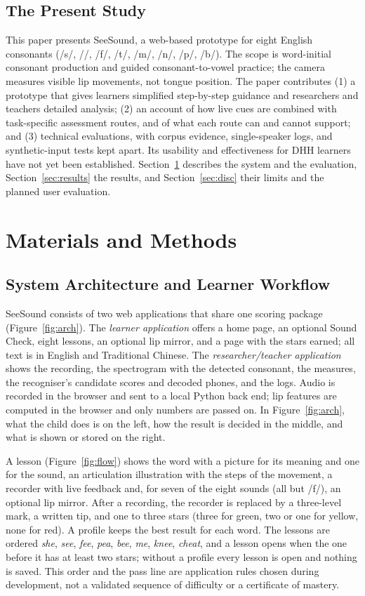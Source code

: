 \documentclass[engproc,article,submit,moreauthors]{Definitions/mdpi}
\newcommand{\ipa}[1]{/#1/}
\begin{document}
\subsection{The Present Study}
This paper presents SeeSound, a web-based prototype for eight English consonants (\ipa{s}, \ipa{\textesh}, \ipa{f}, \ipa{t\textesh}, \ipa{m}, \ipa{n}, \ipa{p}, \ipa{b}). The scope is word-initial consonant production and guided consonant-to-vowel practice; the camera measures visible lip movements, not tongue position. The paper contributes (1) a prototype that gives learners simplified step-by-step guidance and researchers and teachers detailed analysis; (2) an account of how live cues are combined with task-specific assessment routes, and of what each route can and cannot support; and (3) technical evaluations, with corpus evidence, single-speaker logs, and synthetic-input tests kept apart. Its usability and effectiveness for DHH learners have not yet been established. Section~\ref{sec:methods} describes the system and the evaluation, Section~\ref{sec:results} the results, and Section~\ref{sec:disc} their limits and the planned user evaluation.

\section{Materials and Methods}\label{sec:methods}
\subsection{System Architecture and Learner Workflow}
SeeSound consists of two web applications that share one scoring package (Figure~\ref{fig:arch}). The \emph{learner application} offers a home page, an optional Sound Check, eight lessons, an optional lip mirror, and a page with the stars earned; all text is in English and Traditional Chinese. The \emph{researcher/teacher application} shows the recording, the spectrogram with the detected consonant, the measures, the recogniser's candidate scores and decoded phones, and the logs. Audio is recorded in the browser and sent to a local Python back end; lip features are computed in the browser and only numbers are passed on. In Figure~\ref{fig:arch}, what the child does is on the left, how the result is decided in the middle, and what is shown or stored on the right.


A lesson (Figure~\ref{fig:flow}) shows the word with a picture for its meaning and one for the sound, an articulation illustration with the steps of the movement, a recorder with live feedback and, for seven of the eight sounds (all but \ipa{f}), an optional lip mirror. After a recording, the recorder is replaced by a three-level mark, a written tip, and one to three stars (three for green, two or one for yellow, none for red). A profile keeps the best result for each word. The lessons are ordered \textit{she}, \textit{see}, \textit{fee}, \textit{pea}, \textit{bee}, \textit{me}, \textit{knee}, \textit{cheat}, and a lesson opens when the one before it has at least two stars; without a profile every lesson is open and nothing is saved. This order and the pass line are application rules chosen during development, not a validated sequence of difficulty or a certificate of mastery.
\end{document}
